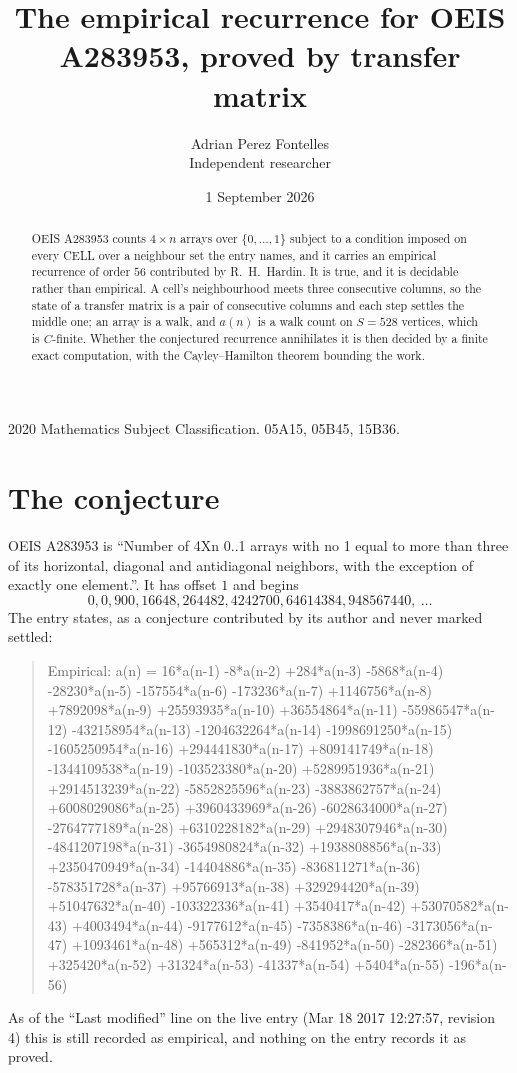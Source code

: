 \documentclass[11pt,a4paper]{article}
\title{The empirical recurrence for OEIS A283953, proved by transfer matrix}
\author{Adrian Perez Fontelles\\ \small Independent researcher}
\date{1 September 2026}
\theoremstyle{plain}
\theoremstyle{definition}
\begin{document}
\maketitle

\begin{abstract}
OEIS A283953 counts $4\times n$ arrays over $\{0,\dots,1\}$ subject to a condition imposed on
every CELL over a neighbour set the entry names, and it carries an empirical recurrence of
order $56$ contributed by R.~H.~Hardin. It is true, and it is decidable rather than
empirical. A cell's neighbourhood meets three consecutive columns, so the state of a transfer
matrix is a pair of consecutive columns and each step settles the middle one; an array is a
walk, and $a(n)$ is a walk count on $S=528$ vertices, which is $C$-finite. Whether the
conjectured recurrence annihilates it is then decided by a finite exact computation, with the
Cayley--Hamilton theorem bounding the work.
\end{abstract}

\noindent\small 2020 Mathematics Subject Classification. 05A15, 05B45, 15B36.\normalsize

\section{The conjecture}

OEIS A283953 is ``Number of 4Xn 0..1 arrays with no 1 equal to more than three of its horizontal, diagonal and antidiagonal neighbors, with the exception of exactly one element.''. It has offset $1$ and begins
\[
0, 0, 900, 16648, 264482, 4242700, 64614384, 948567440,\ \dots
\]
The entry states, as a conjecture contributed by its author and never marked settled:
\begin{quote}
Empirical: a(n) = 16*a(n-1) -8*a(n-2) +284*a(n-3) -5868*a(n-4) -28230*a(n-5) -157554*a(n-6) -173236*a(n-7) +1146756*a(n-8) +7892098*a(n-9) +25593935*a(n-10) +36554864*a(n-11) -55986547*a(n-12) -432158954*a(n-13) -1204632264*a(n-14) -1998691250*a(n-15) -1605250954*a(n-16) +294441830*a(n-17) +809141749*a(n-18) -1344109538*a(n-19) -103523380*a(n-20) +5289951936*a(n-21) +2914513239*a(n-22) -5852825596*a(n-23) -3883862757*a(n-24) +6008029086*a(n-25) +3960433969*a(n-26) -6028634000*a(n-27) -2764777189*a(n-28) +6310228182*a(n-29) +2948307946*a(n-30) -4841207198*a(n-31) -3654980824*a(n-32) +1938808856*a(n-33) +2350470949*a(n-34) -14404886*a(n-35) -836811271*a(n-36) -578351728*a(n-37) +95766913*a(n-38) +329294420*a(n-39) +51047632*a(n-40) -103322336*a(n-41) +3540417*a(n-42) +53070582*a(n-43) +4003494*a(n-44) -9177612*a(n-45) -7358386*a(n-46) -3173056*a(n-47) +1093461*a(n-48) +565312*a(n-49) -841952*a(n-50) -282366*a(n-51) +325420*a(n-52) +31324*a(n-53) -41337*a(n-54) +5404*a(n-55) -196*a(n-56)
\end{quote}
As of the ``Last modified'' line on the live entry (Mar 18 2017 12:27:57, revision 4) this is still
recorded as empirical, and nothing on the entry records it as proved.
\end{document}

